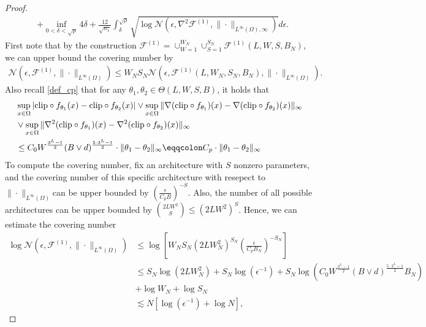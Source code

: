 \documentclass{article}
\newcommand{\F}{\mathcal{F}}
\newcommand{\N}{\mathcal{N}}
\newcommand{\clip}{\textnormal{clip}}
\theoremstyle{plain}
\theoremstyle{definition}
\theoremstyle{remark}
\begin{document}
\begin{proof}
\begin{align*}
            & + \inf_{0 < \delta < \sqrt{\rho}} 4 \delta + \frac{12}{\sqrt{n_1}} \int_\delta^{\sqrt{\rho}} \sqrt{\log \N(\epsilon, \nabla^2 \F^{(1)}, \|\cdot\|_{L^\infty(\Omega), \infty})} d\epsilon.
        \end{align*}
        First note that by the construction $\F^{(1)} = \cup_{W = 1}^{W_N} \cup_{S = 1}^{S_N} \F^{(1)}(L, W, S, B_N)$, we can upper bound the covering number by
        \begin{align*}
            \N(\epsilon,  \F^{(1)} , \|\cdot\|_{L^\infty(\Omega)}) \leq W_N S_N \N(\epsilon,  \F^{(1)}(L, W_N, S_N, B_N), \|\cdot\|_{L^\infty(\Omega)}).
        \end{align*}
        Also recall \eqref{def_cp} that for any $\theta_1, \theta_2 \in \Theta(L, W, S, B)$, it holds that
\begin{equation*}
    \begin{aligned}
    & \sup_{x \in \Omega} |\clip \circ f_{\theta_1}(x) - \clip \circ f_{\theta_2}(x)| \vee \sup_{x \in \Omega} \|\nabla (\clip \circ f_{\theta_1})(x) - \nabla (\clip \circ f_{\theta_2})(x)\|_\infty  \\ & \vee \sup_{x \in \Omega}\|\nabla^2 (\clip \circ f_{\theta_1})(x) - \nabla^2 (\clip \circ f_{\theta_2})(x) \|_{\infty} \\  & \leq C_0  W^{\frac{3^{L}-1}{2}} (B \vee d)^{\frac{5 \cdot 3^{L}-1}{2}} \cdot \|\theta_1 - \theta_2\|_\infty \eqqcolon C_p \cdot \|\theta_1 - \theta_2\|_\infty
\end{aligned}
\end{equation*}
         To compute the covering number, fix an architecture with $S$ nonzero parameters, and the covering number of this specific architecture with resepect to $\|\cdot\|_{L^\infty(\Omega)}$can be upper bounded by $\left(\frac{\epsilon}{C_p B} \right)^{-S}$. Also, the number of all possible architectures can be upper bounded by $\binom{2L W^2}{S} \leq (2 LW^2)^S$. Hence, we can estimate the covering number 
        \begin{align*}
            \log \N(\epsilon, \F^{(1)}, \|\cdot\|_{L^\infty(\Omega)}) & \leq  \log \left[W_N S_N (2 L W_N^2)^{S_N}  \left(\frac{\epsilon}{C_p B_N}\right)^{-S_N}\right] \\
            & \leq S_N \log(2 L W_N^2) + S_N \log (\epsilon^{-1}) + S_N \log ( C_0  W^{\frac{3^{L}-1}{2}} (B \vee d)^{\frac{5 \cdot 3^{L}-1}{2}} B_N) \\
            & + \log W_N + \log S_N \\
            & \lesssim N \left[\log (\epsilon^{-1}) + \log N \right],

\end{align*}
\end{proof}
\end{document}

